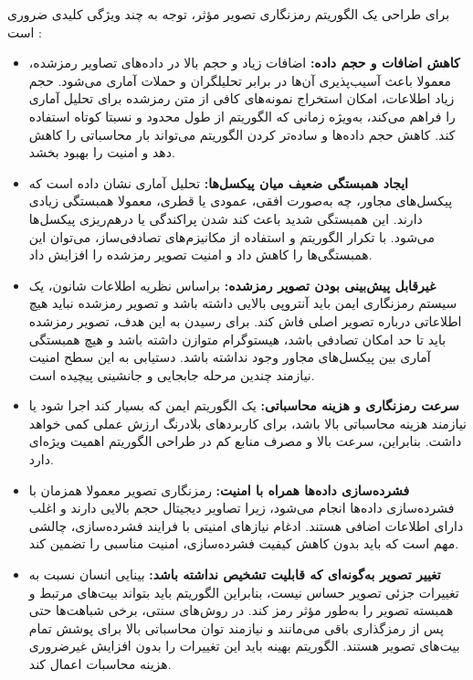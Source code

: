 برای طراحی یک الگوریتم رمزنگاری تصویر مؤثر، توجه به چند ویژگی کلیدی ضروری است \cite{ref44, ref45}:

\begin{itemize}
    \item \textbf{کاهش اضافات و حجم داده:} اضافات زیاد و حجم بالا در داده‌های تصاویر رمزشده، معمولا باعث آسیب‌پذیری آن‌ها در برابر تحلیلگران و حملات آماری می‌شود. حجم زیاد اطلاعات، امکان استخراج نمونه‌های کافی از متن رمزشده برای تحلیل آماری را فراهم می‌کند، به‌ویژه زمانی که الگوریتم از طول محدود و نسبتا کوتاه استفاده کند. کاهش حجم داده‌ها و ساده‌تر کردن الگوریتم می‌تواند بار محاسباتی را کاهش دهد و امنیت را بهبود بخشد.
    \item \textbf{ایجاد همبستگی ضعیف میان پیکسل‌ها:} تحلیل آماری نشان داده است که پیکسل‌های مجاور، چه به‌صورت افقی، عمودی یا قطری، معمولا همبستگی زیادی دارند. این همبستگی شدید باعث کند شدن پراکندگی یا درهم‌ریزی پیکسل‌ها می‌شود. با تکرار الگوریتم و استفاده از مکانیزم‌های تصادفی‌ساز، می‌توان این همبستگی‌ها را کاهش داد و امنیت تصویر رمزشده را افزایش داد.
    \item \textbf{غیرقابل پیش‌بینی بودن تصویر رمزشده:} براساس نظریه اطلاعات شانون، یک سیستم رمزنگاری ایمن باید آنتروپی بالایی داشته باشد و تصویر رمزشده نباید هیچ اطلاعاتی درباره تصویر اصلی فاش کند. برای رسیدن به این هدف، تصویر رمزشده باید تا حد امکان تصادفی باشد، هیستوگرام متوازن داشته باشد و هیچ همبستگی آماری بین پیکسل‌های مجاور وجود نداشته باشد. دستیابی به این سطح امنیت نیازمند چندین مرحله جابجایی و جانشینی پیچیده است.
    \item \textbf{سرعت رمزنگاری و هزینه محاسباتی:} یک الگوریتم ایمن که بسیار کند اجرا شود یا نیازمند هزینه محاسباتی بالا باشد، برای کاربردهای بلادرنگ ارزش عملی کمی خواهد داشت. بنابراین، سرعت بالا و مصرف منابع کم در طراحی الگوریتم اهمیت ویژه‌ای دارد.
    \item \textbf{فشرده‌سازی داده‌ها همراه با امنیت:} رمزنگاری تصویر معمولا همزمان با فشرده‌سازی داده‌ها انجام می‌شود، زیرا تصاویر دیجیتال حجم بالایی دارند و اغلب دارای اطلاعات اضافی هستند. ادغام نیازهای امنیتی با فرایند فشرده‌سازی، چالشی مهم است که باید بدون کاهش کیفیت فشرده‌سازی، امنیت مناسبی را تضمین کند.
    \item \textbf{تغییر تصویر به‌گونه‌ای که قابلیت تشخیص نداشته باشد:} بینایی انسان نسبت به تغییرات جزئی تصویر حساس نیست، بنابراین الگوریتم باید بتواند بیت‌های مرتبط و همبسته تصویر را به‌طور مؤثر رمز کند. در روش‌های سنتی، برخی شباهت‌ها حتی پس از رمزگذاری باقی می‌مانند و نیازمند توان محاسباتی بالا برای پوشش تمام بیت‌های تصویر هستند. الگوریتم بهینه باید این تغییرات را بدون افزایش غیرضروری هزینه محاسبات اعمال کند.
\end{itemize}

